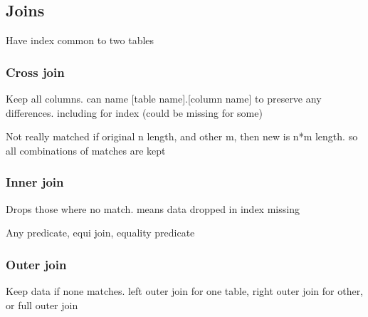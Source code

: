 
\subsection{Joins}

Have index common to two tables

\subsubsection{Cross join}

Keep all columns. can name [table name].[column name] to preserve any differences. including for index (could be missing for some)

Not really matched if original n length, and other m, then new is n*m length. so all combinations of matches are kept

\subsubsection{Inner join}

Drops those where no match. means data dropped in index missing

Any predicate, equi join, equality predicate

\subsubsection{Outer join}

Keep data if none matches. left outer join for one table, right outer join for other, or full outer join

